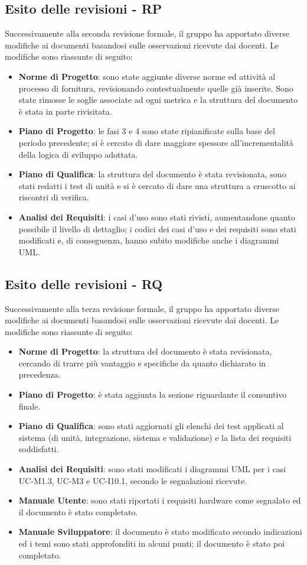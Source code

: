 \subsection{Esito delle revisioni - RP}	
Successivamente alla seconda revisione formale, il gruppo ha apportato diverse modifiche ai documenti basandosi sulle osservazioni ricevute dai docenti. Le modifiche sono riassunte di seguito:
	\begin{itemize}
		\item \textbf{Norme di Progetto}: sono state aggiunte diverse norme ed attività al processo di fornitura, revisionando contestualmente quelle già inserite. Sono state rimosse le soglie associate ad ogni metrica e la struttura del documento è stata in parte rivisitata.
		\item \textbf{Piano di Progetto}: le fasi 3 e 4 sono state ripianificate sulla base del periodo precedente; si è cercato di dare maggiore spessore all'incrementalità della logica di sviluppo adottata. 
		\item \textbf{Piano di Qualifica}: la struttura del documento è stata revisionata, sono stati redatti i test di unità e si è cercato di dare una struttura a cruscotto ai riscontri di verifica.
		\item \textbf{Analisi dei Requisiti}: i casi d'uso sono stati rivisti, aumentandone quanto possibile il livello di dettaglio; i codici dei casi d'uso e dei requisiti sono stati modificati e, di conseguenza, hanno subito modifiche anche i diagrammi UML.
	\end{itemize}

\subsection{Esito delle revisioni - RQ}	
Successivamente alla terza revisione formale, il gruppo ha apportato diverse modifiche ai documenti basandosi sulle osservazioni ricevute dai docenti. Le modifiche sono riassunte di seguito:
	\begin{itemize}
		\item \textbf{Norme di Progetto}: la struttura del documento è stata revisionata, cercando di trarre più vantaggio e specifiche da quanto dichiarato in precedenza.
		\item \textbf{Piano di Progetto}: è stata aggiunta la sezione riguardante il consuntivo finale.
		\item \textbf{Piano di Qualifica}: sono stati aggiornati gli elenchi dei test applicati al sistema (di unità, integrazione, sistema e validazione) e la lista dei requisiti soddisfatti. 
		\item \textbf{Analisi dei Requisiti}: sono stati modificati i diagrammi UML per i casi UC-M1.3, UC-M3 e UC-I10.1, secondo le segnalazioni ricevute.
		\item \textbf{Manuale Utente}: sono stati riportati i requisiti hardware come segnalato ed il documento è stato completato.
		\item \textbf{Manuale Sviluppatore}: il documento è stato modificato secondo indicazioni ed i temi sono stati approfonditi in alcuni punti; il documento è stato poi completato.
	\end{itemize}
\newpage
